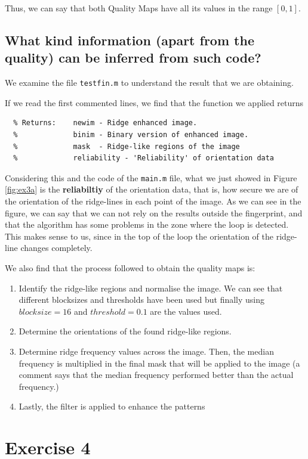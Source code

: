 \documentclass[a4paper]{article}
\def\inline{\lstinline[basicstyle=\ttfamily,keywordstyle={}]}
\begin{document}
Thus, we can say that both Quality Maps have all its values in the range \([0,1]\).

\subsection{ What kind information (apart from the quality) can be inferred from such code?}

We examine the file \inline{testfin.m} to understand the result that we are obtaining.

If we read the first commented lines, we find that the function we applied returns
\begin{verbatim}
  % Returns:    newim - Ridge enhanced image.
  %             binim - Binary version of enhanced image.
  %             mask  - Ridge-like regions of the image
  %             reliability - 'Reliability' of orientation data  
\end{verbatim}
Considering this and the code of the \inline{main.m} file, what we just showed in Figure \ref{fig:ex3a} is the \textbf{reliabiltiy} of the orientation data, that is, how secure we are of the orientation of the ridge-lines in each point of the image. As we can see in the figure, we can say that we can not rely on the results outside the fingerprint, and that the algorithm has some problems in the zone where the loop is detected. This makes sense to us, since in the top of the loop the orientation of the ridge-line changes completely.  

We also find that the process followed to obtain the quality maps is:
\begin{enumerate}
\item Identify the ridge-like regions and normalise the image. We can see that different blocksizes and thresholds have been used but finally using \(blocksize=16\) and \(threshold = 0.1\) are the values used.
\item Determine the orientations of the found ridge-like regions.
\item Determine ridge frequency values across the image. Then, the median frequency is multiplied in the final mask that will be applied to the image (a comment says that the median frequency performed better than the actual frequency.)
\item Lastly, the filter is applied to enhance the patterns
\end{enumerate}




\section{Exercise 4}
\end{document}
